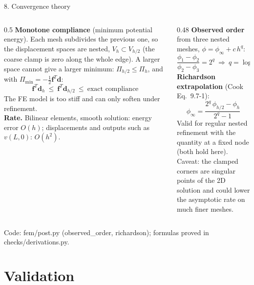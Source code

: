 \documentclass[aspectratio=169,10pt]{beamer}
\newcommand{\vd}{\mathbf d}
\newcommand{\vf}{\mathbf f}
\newcommand{\src}[1]{{\color{muted}\scriptsize #1}}
\begin{document}
\begin{frame}{8. Convergence theory}
  \begin{columns}[T]
    \begin{column}{0.5\textwidth}
      \textbf{Monotone compliance} (minimum potential energy).
      Each mesh subdivides the previous one, so the displacement spaces are nested, $V_h\subset V_{h/2}$
      (the coarse clamp is zero along the whole edge). A larger space cannot give a larger minimum:
      $\Pi_{h/2}\le\Pi_h$, and with $\Pi_{\min}=-\frac12\vf^T\vd$:
      \[
        \vf^T\vd_h\ \le\ \vf^T\vd_{h/2}\ \le\ \text{exact compliance}
      \]
      The FE model is too stiff and can only soften under refinement.\\[4pt]
      \textbf{Rate.} Bilinear elements, smooth solution: energy error $O(h)$; displacements and outputs
      such as $v(L,0)$: $O(h^2)$.
    \end{column}
    \begin{column}{0.48\textwidth}
      \textbf{Observed order} from three nested meshes, $\phi=\phi_\infty+c\,h^q$:
      \[
        \frac{\phi_1-\phi_2}{\phi_2-\phi_3}=2^q\ \Rightarrow\ q=\log_2\frac{\phi_1-\phi_2}{\phi_2-\phi_3}
      \]
      \textbf{Richardson extrapolation} (Cook Eq.~9.7-1):
      \[
        \phi_\infty=\frac{2^q\,\phi_{h/2}-\phi_h}{2^q-1}
      \]
      Valid for regular nested refinement with the quantity at a fixed node (both hold here).\\[4pt]
      Caveat: the clamped corners are singular points of the 2D solution and could lower the
      asymptotic rate on much finer meshes.
    \end{column}
  \end{columns}
  \vfill
  \src{Code: fem/post.py (observed\_order, richardson); formulas proved in checks/derivations.py.}
\end{frame}

\section{Validation}
\end{document}

